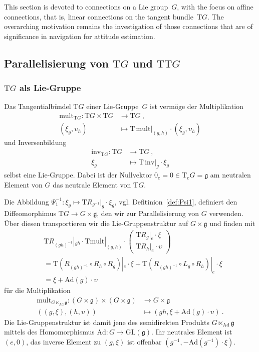 \documentclass[10pt,a4paper]{article}
\theoremstyle{mytheorem}
\theoremstyle{mydefinition}
\newcommand{\Tt}{\mathrm{T}}
\newcommand{\Ad}{\mathrm{Ad}}
\begin{document}
This section is devoted to connections on a Lie group~$G$,
with the focus on affine connections, that is, linear connections on the tangent bundle~$\Tt G$.
The overarching motivation remains the investigation of those connections that are of significance in navigation for attitude estimation.

\subsection{Parallelisierung von $\Tt G$ und $\Tt\Tt G$}

\subsubsection{$\Tt G$ als Lie-Gruppe}

Das Tangentialbündel $\Tt G$ einer Lie-Gruppe~$G$ ist vermöge der Multiplikation
\begin{align}
	\mathrm{mult}_{\Tt G}:
	\Tt G\times\Tt G 
	&\rightarrow \Tt G
	\ ,\nonumber\\
	(\xi_g, \upsilon_h)
	&\mapsto
	\Tt\,\mathrm{mult}|_{(g,h)}
	\cdot
	(\xi_g, \upsilon_h)
\end{align}
und Inversenbildung
\begin{align}
	\mathrm{inv}_{\Tt G}:
	\Tt G
	&\rightarrow \Tt G
	\ ,\nonumber\\
	\xi_g
	&\mapsto
	\Tt\,\mathrm{inv}|_{g}
	\cdot
	\xi_g
\end{align}
selbst eine Lie-Gruppe.
Dabei ist der Nullvektor $0_e=0\in\Tt_eG=\mathfrak{g}$ am neutralen Element von $G$ das neutrale Element von $\Tt G$.

Die Abbildung $\Psi_1^{-1}:\xi_g\mapsto\Tt R_{g^{-1}}|_g\cdot \xi_g$, vgl. Defitinion~\ref{def:Psi1}, definiert den Diffeomorphimus $\Tt G\rightarrow G\times\mathfrak{g}$, den wir zur Parallelisierung von $G$ verwenden.
Über diesen transportieren wir die Lie-Gruppenstruktur auf $G\times\mathfrak{g}$ und finden mit
\begin{align*}
	&\Tt R_{(gh)^{-1}}|_{gh}
	\cdot
	\Tt\mathrm{mult}|_{(g,h)}
	\cdot
	\begin{pmatrix}
		\Tt R_g|_e\cdot \xi \\
		\Tt R_h|_e\cdot \upsilon
	\end{pmatrix}
	\nonumber\\
	&=
	\Tt(R_{(gh)^{-1}}\circ R_h\circ R_g)|_e\cdot\xi
	+
	\Tt(R_{(gh)^{-1}}\circ L_g\circ R_h)|_e\cdot\xi
	\nonumber\\
	&= \xi + \Ad(g)\cdot\upsilon 
\end{align*}
für die Multiplikation
\begin{align}
	\mathrm{mult}_{G\ltimes_{\Ad}\mathfrak{g}}:
	(G\times\mathfrak{g})\times(G\times\mathfrak{g})
	&\rightarrow G\times\mathfrak{g}
	\nonumber\\
	((g,\xi), (h,\upsilon))
	&\mapsto
	(gh, \xi + \Ad(g)\cdot\upsilon)
	\ .
\end{align}
Die Lie-Gruppenstruktur ist damit jene des semidirekten Produkts
$G\ltimes_{\Ad}\mathfrak{g}$ mittels des Homomorphismus $\Ad:G\rightarrow\mathrm{GL}(\mathfrak{g})$.
Ihr neutrales Element ist $(e,0)$, 
das inverse Element zu $(g,\xi)$ ist offenbar $(g^{-1},-\Ad(g^{-1})\cdot\xi)$.
\end{document}
